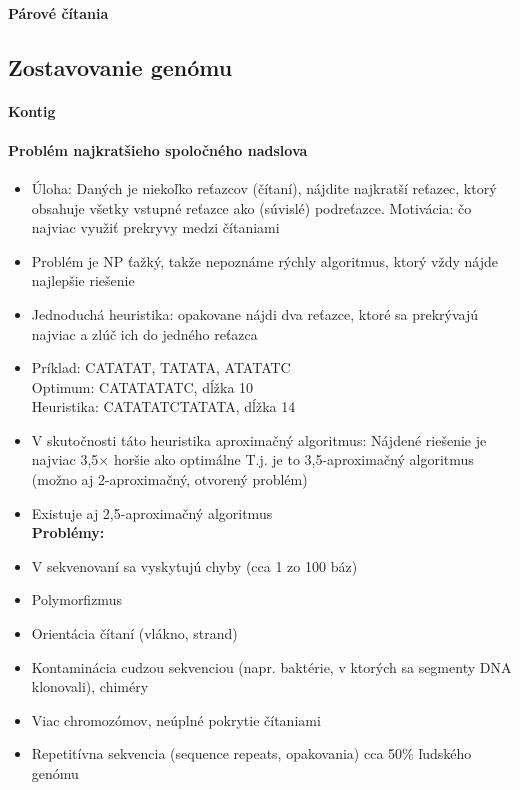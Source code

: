 			\paragraph{Párové čítania}

		\subsection{Zostavovanie genómu}
			\paragraph{Kontig}
			\paragraph{Problém najkratšieho spoločného nadslova}
					\begin{itemize}
						\item Úloha: Daných je niekoľko reťazcov (čítaní), nájdite najkratší reťazec, ktorý obsahuje všetky vstupné reťazce ako (súvislé) podreťazce. Motivácia: čo najviac využiť prekryvy medzi čítaniami
						\item Problém je NP ťažký, takže nepoznáme rýchly algoritmus, ktorý vždy nájde najlepšie riešenie
						\item Jednoduchá heuristika: opakovane nájdi dva reťazce, ktoré sa prekrývajú najviac a zlúč ich do jedného reťazca
						\item Príklad: CATATAT, TATATA, ATATATC\\
						 Optimum: CATATATATC, dĺžka 10\\
						 Heuristika: CATATATCTATATA, dĺžka 14
						\item V skutočnosti táto heuristika aproximačný algoritmus: Nájdené riešenie je najviac 3,5$\times$ horšie ako optimálne T.j. je to 3,5-aproximačný algoritmus (možno aj 2-aproximačný, otvorený problém)
						\item Existuje aj 2,5-aproximačný algoritmus
					\\\textbf{Problémy:}
						\item V sekvenovaní sa vyskytujú chyby (cca 1 zo 100 báz)
						\item Polymorfizmus
						\item Orientácia čítaní (vlákno, strand)
						\item Kontaminácia cudzou sekvenciou (napr. baktérie, v ktorých sa segmenty DNA klonovali), chiméry
						\item Viac chromozómov, neúplné pokrytie čítaniami
						\item Repetitívna sekvencia (sequence repeats, opakovania) cca 50\% ľudského genómu

\end{itemize}
